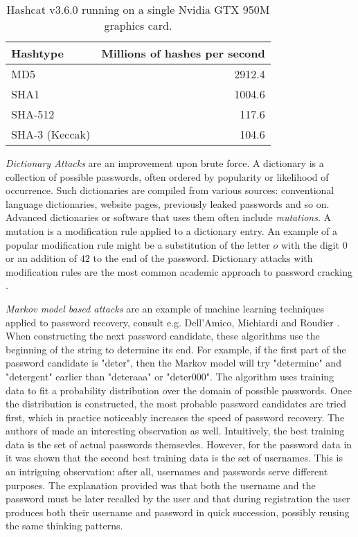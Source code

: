 \begin{table}
    \begin{center}
        \begin{tabular}{lr}
            Hashtype & Millions of hashes per second \\
            \hline
            MD5 & 2912.4 \\
            SHA1 & 1004.6 \\
            SHA-512 & 117.6 \\
            SHA-3 (Keccak) & 104.6
          \end{tabular}
      \end{center}
      \caption{Hashcat v3.6.0 running on a single Nvidia GTX 950M graphics card.}
      \label{table:hashcat-speed}
  \end{table}

\emph{Dictionary Attacks} are an improvement upon brute force. A dictionary is a collection of possible passwords, often ordered by popularity or likelihood of occurrence. Such dictionaries are compiled from various sources: conventional language dictionaries, website pages, previously leaked passwords and so on. Advanced dictionaries or software that uses them often include \emph{mutations}. A mutation is a modification rule applied to a dictionary entry. An example of a popular modification rule might be a substitution of the letter \(o\) with the digit \(0\) or an addition of \(42\) to the end of the password. Dictionary attacks with modification rules are the most common academic approach to password cracking \cite{zhang2010security, weir2010testing, kelley2012guess, shay2010encountering}.

\emph{Markov model based attacks} are an example of machine learning techniques applied to password recovery, consult e.g. Dell’Amico, Michiardi and Roudier \cite{dell:2010:password}. When constructing the next password candidate, these algorithms use the beginning of the string to determine its end. For example, if the first part of the password candidate is "deter", then the Markov model will try "determine" and "detergent" earlier than "deteraaa" or "deter000". The algorithm uses training data to fit a probability distribution over the domain of possible passwords. Once the distribution is constructed, the most probable password candidates are tried first, which in practice noticeably increases the speed of password recovery. The authors of \cite{dell:2010:password} made an interesting observation as well. Intuitively, the best training data is the set of actual passwords themsevles. However, for the password data in \cite{dell:2010:password} it was shown that the second best training data is the set of usernames. This is an intriguing observation: after all, usernames and passwords serve different purposes. The explanation provided was that both the username and the password must be later recalled by the user and that during registration the user produces both their username and password in quick succession, possibly reusing the same thinking patterns.

